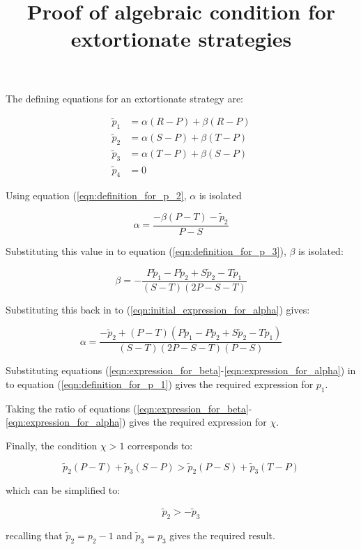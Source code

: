 \documentclass[a4]{article}
\title{Proof of algebraic condition for extortionate strategies}
\author{}
\date{}
\begin{document}
\maketitle

The defining equations for an extortionate strategy are:


\begin{align}
    \tilde p_1 & = \alpha (R - P) + \beta (R - P)\label{eqn:definition_for_p_1}\\
    \tilde p_2 & = \alpha (S - P) + \beta (T - P)\label{eqn:definition_for_p_2}\\
    \tilde p_3 & = \alpha (T - P) + \beta (S - P)\label{eqn:definition_for_p_3}\\
    \tilde p_4 & = 0
\end{align}

Using equation (\ref{eqn:definition_for_p_2}, \(\alpha\) is isolated

\begin{equation}\label{eqn:initial_expression_for_alpha}
    \alpha = \frac{-\beta (P - T) - \tilde p_2}
                  {P - S}
\end{equation}

Substituting this value in to equation (\ref{eqn:definition_for_p_3}), \(\beta\)
is isolated:

\begin{equation}\label{eqn:expression_for_beta}
    \beta = -\frac{P\tilde p_1 - P \tilde p_2 + S \tilde p_2 - T \tilde p_1}
                  {(S - T)(2 P - S - T)}
\end{equation}

Substituting this back in to (\ref{eqn:initial_expression_for_alpha}) gives:

\begin{equation}\label{eqn:expression_for_alpha}
    \alpha = \frac{-\tilde p_2 + (P - T)(P \tilde p_1 - P\tilde p_2 + S\tilde p_2 - T\tilde p_1)}
                  {(S - T)(2P - S - T)(P - S)}
\end{equation}

Substituting equations
(\ref{eqn:expression_for_beta}-\ref{eqn:expression_for_alpha}) in to
equation (\ref{eqn:definition_for_p_1}) gives the required expression for
\(p_1\).

Taking the ratio of equations
(\ref{eqn:expression_for_beta}-\ref{eqn:expression_for_alpha}) gives the
required expression for \(\chi\).

Finally, the condition \(\chi > 1\) corresponds to:


\begin{equation}
\tilde p_2 (P - T) + \tilde p_3 (S - P) >
                                      \tilde p_2 (P - S) + \tilde p_3 (T - P)
\end{equation}

which can be simplified to:

\begin{equation}
    \tilde p_2 > - \tilde p_3
\end{equation}

recalling that \(\tilde p_2 = p_2 - 1\) and \(\tilde p_3 = p_3\) gives the
required result.
\end{document}
